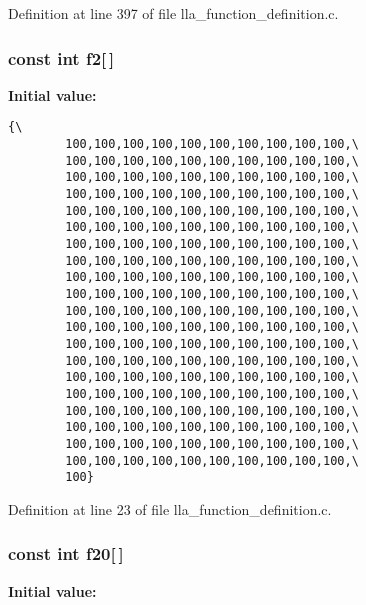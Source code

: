 Definition at line 397 of file lla\_\-function\_\-definition.c.
\subsubsection{\setlength{\rightskip}{0pt plus 5cm}const int {\bf f2}[$\,$]}\label{lla__function__definition_8c_a1}


{\bf Initial value:}

\footnotesize\begin{verbatim}{\
        100,100,100,100,100,100,100,100,100,100,\
        100,100,100,100,100,100,100,100,100,100,\
        100,100,100,100,100,100,100,100,100,100,\
        100,100,100,100,100,100,100,100,100,100,\
        100,100,100,100,100,100,100,100,100,100,\
        100,100,100,100,100,100,100,100,100,100,\
        100,100,100,100,100,100,100,100,100,100,\
        100,100,100,100,100,100,100,100,100,100,\
        100,100,100,100,100,100,100,100,100,100,\
        100,100,100,100,100,100,100,100,100,100,\
        100,100,100,100,100,100,100,100,100,100,\
        100,100,100,100,100,100,100,100,100,100,\
        100,100,100,100,100,100,100,100,100,100,\
        100,100,100,100,100,100,100,100,100,100,\
        100,100,100,100,100,100,100,100,100,100,\
        100,100,100,100,100,100,100,100,100,100,\
        100,100,100,100,100,100,100,100,100,100,\
        100,100,100,100,100,100,100,100,100,100,\
        100,100,100,100,100,100,100,100,100,100,\
        100,100,100,100,100,100,100,100,100,100,\
        100}
\end{verbatim}\normalsize 


Definition at line 23 of file lla\_\-function\_\-definition.c.
\subsubsection{\setlength{\rightskip}{0pt plus 5cm}const int {\bf f20}[$\,$]}\label{lla__function__definition_8c_a19}


{\bf Initial value:}

